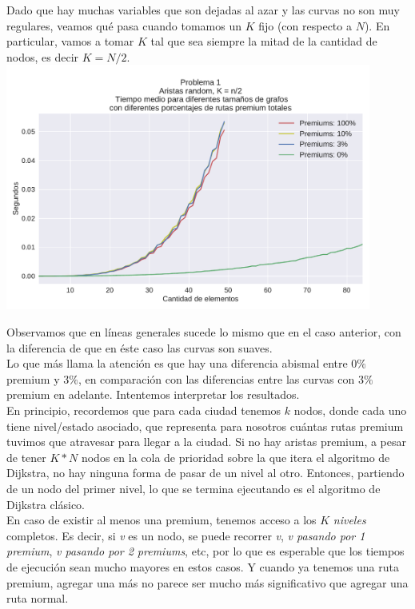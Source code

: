 Dado que hay muchas variables que son dejadas al azar y las curvas no son muy regulares, veamos qué pasa cuando tomamos un $K$ fijo (con respecto a $N$). En particular, vamos a tomar $K$ tal que sea siempre la mitad de la cantidad de nodos, es decir $K = N/2$. \\

{\centering
  \includegraphics[width=0.9\textwidth]{imagenes/problema1/kfijo.pdf} \\
}

Observamos que en líneas generales sucede lo mismo que en el caso anterior, con la diferencia de que en éste caso las curvas son suaves. \\

Lo que más llama la atención es que hay una diferencia abismal entre $0\%$ premium y $3\%$, en comparación con las diferencias entre las curvas con $3\%$ premium en adelante. Intentemos interpretar los resultados. \\

En principio, recordemos que para cada ciudad tenemos $k$ nodos, donde cada uno tiene nivel/estado asociado, que representa para nosotros cuántas rutas premium tuvimos que atravesar para llegar a la ciudad. Si no hay aristas premium, a pesar de tener $K*N$ nodos en la cola de prioridad sobre la que itera el algoritmo de Dijkstra, no hay ninguna forma de pasar de un nivel al otro. Entonces, partiendo de un nodo del primer nivel, lo que se termina ejecutando es el algoritmo de Dijkstra clásico. \\

En caso de existir al menos una premium, tenemos acceso a los $K$ \textit{niveles} completos. Es decir, si \textit{v} es un nodo, se puede recorrer \textit{v}, \textit{v pasando por 1 premium}, \textit{v pasando por 2 premiums}, etc, por lo que es esperable que los tiempos de ejecución sean mucho mayores en estos casos. Y cuando ya tenemos una ruta premium, agregar una más no parece ser mucho más significativo que agregar una ruta normal. \\


